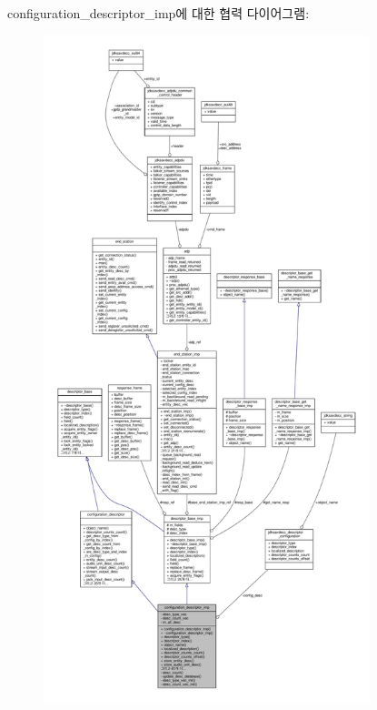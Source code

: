 configuration\+\_\+descriptor\+\_\+imp에 대한 협력 다이어그램\+:
\nopagebreak
\begin{figure}[H]
\begin{center}
\leavevmode
\includegraphics[height=550pt]{classavdecc__lib_1_1configuration__descriptor__imp__coll__graph}
\end{center}
\end{figure}
